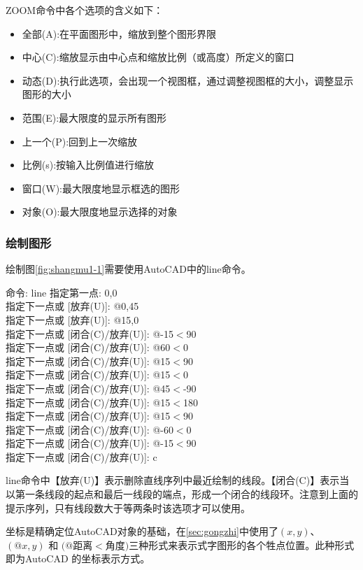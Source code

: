 ZOOM命令中各个选项的含义如下：
\begin{itemize}
\item 全部(A):在平面图形中，缩放到整个图形界限
\item 中心(C):缩放显示由中心点和缩放比例（或高度）所定义的窗口
\item 动态(D):执行此选项，会出现一个视图框，通过调整视图框的大小，调整显示图形的大小
\item 范围(E):最大限度的显示所有图形
\item 上一个(P):回到上一次缩放
\item 比例(s):按输入比例值进行缩放
\item 窗口(W):最大限度地显示框选的图形
\item 对象(O):最大限度地显示选择的对象
\end{itemize}
\subsubsection{绘制图形}
绘制图\ref{fig:shangmu1-1}需要使用AutoCAD中的line命令。

\noindent
命令: line 指定第一点: 0,0\\
指定下一点或 [放弃(U)]: @0,45\\
指定下一点或 [放弃(U)]: @15,0\\
指定下一点或 [闭合(C)/放弃(U)]: @-15$<$90\\
指定下一点或 [闭合(C)/放弃(U)]: @60$<$0\\
指定下一点或 [闭合(C)/放弃(U)]: @15$<$90\\
指定下一点或 [闭合(C)/放弃(U)]: @15$<$0\\
指定下一点或 [闭合(C)/放弃(U)]: @45$<$-90\\
指定下一点或 [闭合(C)/放弃(U)]: @15$<$180\\
指定下一点或 [闭合(C)/放弃(U)]: @15$<$90\\
指定下一点或 [闭合(C)/放弃(U)]: @-60$<$0\\
指定下一点或 [闭合(C)/放弃(U)]: @-15$<$90\\
指定下一点或 [闭合(C)/放弃(U)]: c

\indent
line命令中【放弃(U)】表示删除直线序列中最近绘制的线段。【闭合(C)】表示当以第一条线段的起点和最后一线段的端点，形成一个闭合的线段环。注意到上面的提示序列，只有线段数大于等两条时该选项才可以使用。

坐标是精确定位AutoCAD对象的基础，在\ref{sec:gongzhi}中使用了$(x,y)$、$(@x,y)$ 和 $(@$距离$<$角度$)$三种形式来表示式字图形的各个牲点位置。此种形式即为Auto\-CAD 的坐标表示方式。
